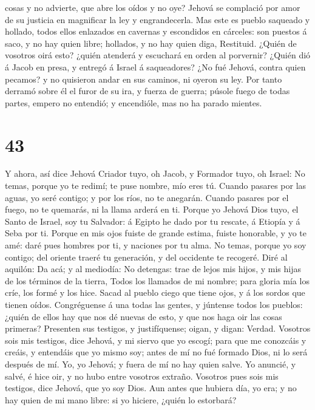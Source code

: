 cosas y no advierte, que abre los oídos y no oye?  Jehová
se complació por amor de su justicia en magnificar la ley y
engrandecerla.  Mas este es pueblo saqueado y hollado,
todos ellos enlazados en cavernas y escondidos en cárceles: son puestos
á saco, y no hay quien libre; hollados, y no hay quien diga, Restituid.
 ¿Quién de vosotros oirá esto? ¿quién atenderá y escuchará
en orden al porvernir?  ¿Quién dió á Jacob en presa, y
entregó á Israel á saqueadores? ¿No fué Jehová, contra quien pecamos? y
no quisieron andar en sus caminos, ni oyeron su ley.  Por
tanto derramó sobre él el furor de su ira, y fuerza de guerra; púsole
fuego de todas partes, empero no entendió; y encendióle, mas no ha
parado mientes.

\hypertarget{section-42}{%
\section{43}\label{section-42}}

 Y ahora, así dice Jehová Criador tuyo, oh Jacob, y Formador
tuyo, oh Israel: No temas, porque yo te redimí; te puse nombre, mío eres
tú.  Cuando pasares por las aguas, yo seré contigo; y por
los ríos, no te anegarán. Cuando pasares por el fuego, no te quemarás,
ni la llama arderá en ti.  Porque yo Jehová Dios tuyo, el
Santo de Israel, soy tu Salvador: á Egipto he dado por tu rescate, á
Etiopía y á Seba por ti.  Porque en mis ojos fuiste de
grande estima, fuiste honorable, y yo te amé: daré pues hombres por ti,
y naciones por tu alma.  No temas, porque yo soy contigo;
del oriente traeré tu generación, y del occidente te recogeré.
 Diré al aquilón: Da acá; y al mediodía: No detengas: trae
de lejos mis hijos, y mis hijas de los términos de la tierra,
 Todos los llamados de mi nombre; para gloria mía los críe,
los formé y los hice.  Sacad al pueblo ciego que tiene ojos,
y á los sordos que tienen oídos.  Congréguense á una todas
las gentes, y júntense todos los pueblos: ¿quién de ellos hay que nos dé
nuevas de esto, y que nos haga oir las cosas primeras? Presenten sus
testigos, y justifíquense; oigan, y digan: Verdad. 
Vosotros sois mis testigos, dice Jehová, y mi siervo que yo escogí; para
que me conozcáis y creáis, y entendáis que yo mismo soy; antes de mí no
fué formado Dios, ni lo será después de mí.  Yo, yo Jehová;
y fuera de mí no hay quien salve.  Yo anuncié, y salvé, é
hice oir, y no hubo entre vosotros extraño. Vosotros pues sois mis
testigos, dice Jehová, que yo soy Dios.  Aun antes que
hubiera día, yo era; y no hay quien de mi mano libre: si yo hiciere,
¿quién lo estorbará?

